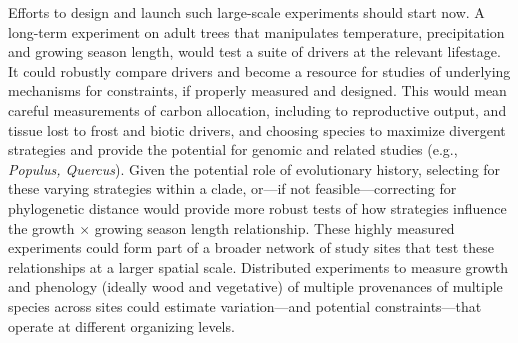\documentclass[11pt]{article}
\begin{document}
Efforts to design and launch such large-scale experiments should start now. A long-term experiment on adult trees that manipulates temperature, precipitation and growing season length, would test a suite of drivers at the relevant lifestage. It could robustly compare drivers and become a resource for studies of underlying mechanisms for constraints, if properly measured and designed. This would mean careful measurements of carbon allocation, including to reproductive output, and tissue lost to frost and biotic drivers, and choosing species to maximize divergent strategies and provide the potential for genomic and related studies (e.g., \emph{Populus, Quercus}). Given the potential role of evolutionary history, selecting for these varying strategies within a clade, or---if not feasible---correcting for phylogenetic distance would provide more robust tests of how strategies influence the growth $\times$ growing season length relationship. %
These highly measured experiments could form part of a broader network of study sites that test these relationships at a larger spatial scale. Distributed experiments to measure growth and phenology (ideally wood and vegetative) of multiple provenances of multiple species across sites could estimate variation---and potential constraints---that operate at different organizing levels. 
\end{document}
